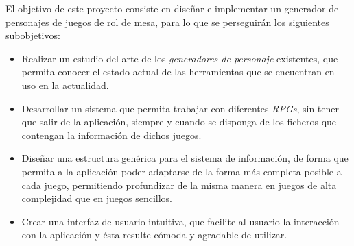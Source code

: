 El objetivo de este proyecto consiste en diseñar e implementar un generador de personajes de juegos de rol de mesa, para lo que se 
perseguirán los siguientes subobjetivos:
\begin{itemize}

    \item Realizar un estudio del arte de los \textit{generadores de personaje} existentes, que permita conocer el estado actual de las herramientas
    que se encuentran en uso en la actualidad.

    \item Desarrollar un sistema que permita trabajar con diferentes \textit{RPGs}, sin tener que salir de la aplicación, siempre y 
    cuando se disponga de los ficheros que contengan la información de dichos juegos.

    \item Diseñar una estructura genérica para el sistema de información, de forma que permita a la aplicación poder adaptarse de la forma más completa posible a 
    cada juego, permitiendo profundizar de la misma manera en juegos de alta complejidad que en juegos sencillos.

    \item Crear una interfaz de usuario intuitiva, que facilite al usuario la interacción con la aplicación y ésta resulte cómoda y 
    agradable de utilizar.

\end{itemize}